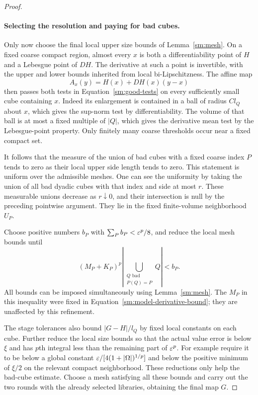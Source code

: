 \begin{proof}
\paragraph{Selecting the resolution and paying for bad cubes.}
Only now choose the final local upper size
bounds of Lemma~\ref{sm:mesh}.  On a fixed
coarse compact region, almost every $x$ is
both a differentiability point of $H$ and a
Lebesgue point of $DH$.  The derivative at
such a point is invertible, with the upper
and lower bounds inherited from local
bi-Lipschitzness.  The affine map
\[
 A_x(y)=H(x)+DH(x)(y-x)
\]
then passes both tests in
Equation~\eqref{sm:good-tests} on every sufficiently
small cube containing $x$.  Indeed its
enlargement is contained in a ball of radius
$C l_Q$ about $x$, which gives the sup-norm
test by differentiability.  The volume of
that ball is at most a fixed multiple of
$|Q|$, which gives the derivative mean test
by the Lebesgue-point property.  Only
finitely many coarse thresholds occur near
a fixed compact set.

It follows that the measure of the union of
bad cubes with a fixed coarse index $P$
tends to zero as their local upper side
length tends to zero.  This statement is
uniform over the admissible meshes.  One
can see the uniformity by taking the union
of all bad dyadic cubes with that index
and side at most $r$.  These measurable
unions decrease as $r\downarrow0$, and
their intersection is null by the preceding
pointwise argument.  They lie in the fixed
finite-volume neighborhood $U_P$.

Choose positive numbers $b_P$ with
$\sum_Pb_P<\varepsilon^p/8$, and reduce the
local mesh bounds until
\begin{equation}
 \label{sm:bad-error-budget}
 (M_P+K_P)^p
 \left|\bigcup_{\substack{Q\text{ bad}\\P(Q)=P}}Q\right|
 <b_P.
\end{equation}
All bounds can be imposed simultaneously
using Lemma~\ref{sm:mesh}.  The $M_P$ in
this inequality were fixed in
Equation~\eqref{sm:model-derivative-bound}; they
are unaffected by this refinement.

The stage tolerances also bound
$|G-H|/l_Q$ by fixed local constants
on each cube.  Further reduce the
local size bounds so that the actual
value error is below $\xi$ and has
$p$th integral less than the remaining
part of $\varepsilon^p$.  For example require
it to be below a global constant
$\varepsilon/[4(1+|\Omega|)^{1/p}]$ and below
the positive minimum of $\xi/2$ on
the relevant compact neighborhood.
These reductions only help the bad-cube
estimate.  Choose a mesh satisfying all these bounds and carry
out the two rounds with the already selected libraries, obtaining
the final map $G$.


\end{proof}
